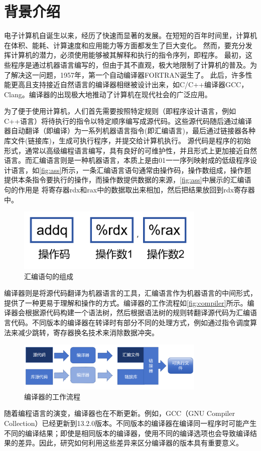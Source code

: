 \section{背景介绍}
电子计算机自诞生以来，经历了快速而显著的发展。在短短的百年时间里，计算机在体积、能耗、计算速度和应用能力等方面都发生了巨大变化。
然而，要充分发挥计算机的潜力，必须使用能够被其解释和执行的指令序列，即程序。
最初，这些程序是通过机器语言编写的，但由于其不直观，极大地限制了计算机的普及。为了解决这一问题，1957年，第一个自动编译器FORTRAN诞生了。
此后，许多性能更高且支持接近自然语言的编译器相继被设计出来，如C/C++编译器GCC，Clang。编译器的出现极大地推动了计算机在现代社会的广泛应用。

\par
为了便于使用计算机，人们首先需要按照特定规则（即程序设计语言，例如C++语言）将待执行的指令以特定顺序编写成源代码。这些源代码随后通过编译器自动翻译（即编译）为一系列机器语言指令(即汇编语言)，最后通过链接器各种库文件(链接库)，生成可执行程序，并提交给计算机执行。
源代码是程序的初始形式，通常以高级编程语言编写，具有良好的可维护性，并且形式上更加接近自然语言。而汇编语言则是一种机器语言，本质上是由01一一序列映射成的低级程序设计语言，如\autoref{fig:ass}所示，一条汇编语言语句通常由操作码，操作数组成，操作题提供本条指令要执行的操作，而操作数提供数据的来源，\autoref{fig:ass}中展示的汇编语句的作用是 将寄存器rdx和rax中的数据取出来相加，然后把结果放回到rdx寄存器中。
\begin{figure}[H]
    \centering
    \includegraphics[width=0.8\textwidth]{figures/ass.png}
    \caption{汇编语句的组成}
    \label{fig:ass}
\end{figure}
编译器则是将源代码翻译为机器语言的工具，汇编语言作为机器语言的中间形式，提供了一种更易于理解和操作的方式。编译器的工作流程如\autoref{fig:compiler}所示。编译器会根据源代码构建一个语法树，然后根据语法树的规则转翻译源代码为汇编语言代码。不同版本的编译器在转译时有部分不同的处理方式，例如通过指令调度算法来减少跳转，寄存器换名技术来消除数据冲突。
\begin{figure}
    \centering
    \includegraphics[width=0.8\textwidth]{figures/compiler.png}
    \caption{编译器的工作流程}
    \label{fig:compiler}
\end{figure}
随着编程语言的演变，编译器也在不断更新。例如，GCC（GNU Compiler Collection）已经更新到13.2.0版本。不同版本的编译器在编译同一程序时可能产生不同的编译结果；即使是相同版本的编译器，使用不同的编译选项也会导致编译结果的差异。因此，研究如何利用这些差异来区分编译器的版本具有重要意义。
\par
